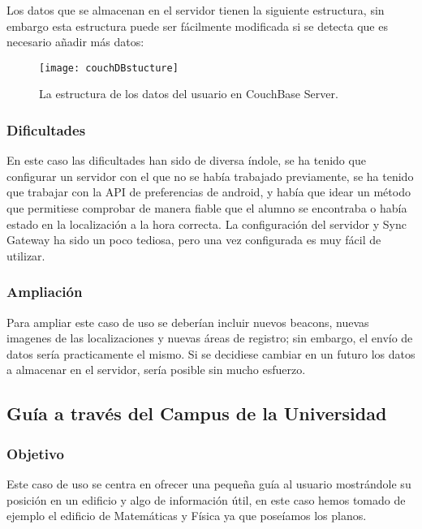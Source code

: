 Los datos que se almacenan en el servidor tienen la siguiente estructura, sin embargo esta estructura puede ser fácilmente modificada si se detecta que es necesario añadir más datos: 

\begin{figure}[H]
	\centering
	\texttt{[image: couchDBstucture]}
	\caption{La estructura de los datos del usuario en CouchBase Server.}
	\label{fig:couchDBstucture}
\end{figure}


\subsubsection{Dificultades}

En este caso las dificultades han sido de diversa índole, se ha tenido que configurar un servidor con el que no se había trabajado previamente, se ha tenido que trabajar con la API de preferencias de android, y había que idear un método que permitiese comprobar de manera fiable que el alumno se encontraba o había estado en la localización a la hora correcta. La configuración del servidor y Sync Gateway ha sido un poco tediosa, pero una vez configurada es muy fácil de utilizar.


\subsubsection{Ampliación}

Para ampliar este caso de uso se deberían incluir nuevos beacons, nuevas imagenes de las localizaciones y nuevas áreas de registro; sin embargo, el envío de datos sería practicamente el mismo. Si se decidiese cambiar en un futuro los datos a almacenar en el servidor, sería posible sin mucho esfuerzo.

\subsection{Guía a través del Campus de la Universidad}

\subsubsection{Objetivo}

Este caso de uso se centra en ofrecer una pequeña guía al usuario mostrándole su posición en un edificio y algo de información útil, en este caso hemos tomado de ejemplo el edificio de Matemáticas y Física ya que poseíamos los planos. 

